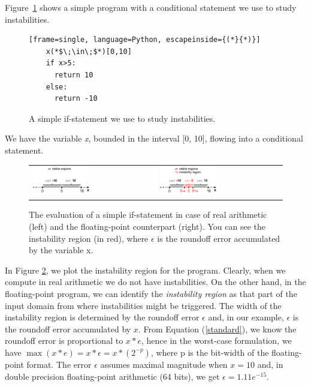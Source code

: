 Figure~\ref{fig:ifstatement} shows a simple program with a conditional statement we use to study instabilities.
%
\begin{figure}[tb!]
	\begin{lstlisting}[frame=single, language=Python, escapeinside={(*}{*)}]
	x(*$\;\in\;$*)[0,10]
	if x>5:
	  return 10
	else:
	  return -10	
	\end{lstlisting}
	\caption{A simple if-statement we use to study instabilities.}\label{fig:ifstatement}
\end{figure}
%
We have the variable \emph{x}, bounded in the interval [0, 10], flowing into a conditional statement.
%
\begin{figure}[tb!]
	\centering
	\begin{tabular}{ll}
		\includegraphics[width=0.48\textwidth]{pic/ifreal.png}
		&
		\includegraphics[width=0.48\textwidth]{pic/iffp.png}
	\end{tabular}
	\caption{The evaluation of a simple if-statement in case of real arithmetic (left) and the floating-point counterpart (right). You can see the instability region (in red), where $\epsilon$ is the roundoff error accumulated by the variable x.}
	\label{fig:ifreal}
\end{figure}
%
In Figure \ref{fig:ifreal}, we plot the instability region for the program. Clearly, when we compute in real arithmetic we do not have instabilities. On the other hand, in the floating-point program, we can identify the \emph{instability region} as that part of the input domain from where instabilities might be triggered.
%
The width of the instability region is determined by the roundoff error $\epsilon$ and, in our example, $\epsilon$ is the roundoff error accumulated by $x$. From Equation (\ref{standard}), we know the roundoff error is proportional to $x*e$, hence in the worst-case formulation, we have $\max(x*e) = x*\epsilon = x*(2^{-p})$, where p is the bit-width of the floating-point format. The error $\epsilon$ assumes maximal magnitude when $x=10$ and, in double precision floating-point arithmetic (64 bits), we get $\epsilon=1.11e^{-15}$.
%

